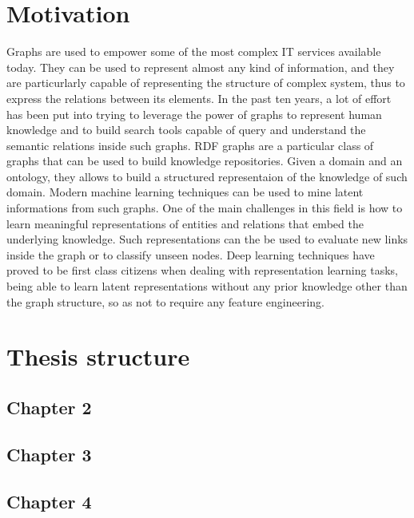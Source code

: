 \documentclass[%
    corpo=13.5pt,
    twoside,
    oldstyle,
    tipotesi=magistrale,
    greek,
    evenboxes
]{toptesi}
\begin{document}
\section{Motivation}

Graphs are used to empower some of the most complex IT services available
today. They can be used to represent almost any kind of information, and
they are particurlarly capable of representing the structure of complex
system, thus to express the relations between its elements.
\newline
\newline
In the past ten years, a lot of effort has been put into trying to leverage the power
of graphs to represent human knowledge and to build search tools capable of
query and understand the semantic relations inside such graphs. RDF graphs are a
particular class of graphs that can be used to build knowledge
repositories. Given a domain and an ontology, they allows to build a structured
representaion of the knowledge of such domain.
\newline
\newline
Modern machine learning techniques can be used to mine latent informations
from such graphs. One of the main challenges in this field is how to learn
meaningful representations of entities and relations that embed
the underlying knowledge. Such representations can the be used to evaluate
new links inside the graph or to classify unseen nodes.
Deep learning techniques have proved to be first class citizens when
dealing with representation learning tasks, being able to learn latent
representations without any prior knowledge other than the graph structure,
so as not to require any feature engineering.



\section{Thesis structure}

\subsection{Chapter 2}

\subsection{Chapter 3}

\subsection{Chapter 4}
\end{document}
